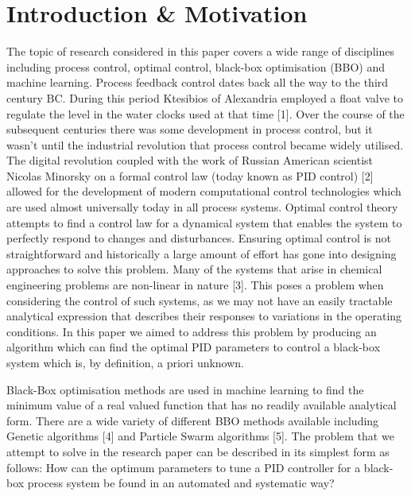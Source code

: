 \documentclass[conference]{IEEEtran}
\theoremstyle{definition}
\begin{document}
\section{Introduction \& Motivation}
\noindent The topic of research considered in this paper covers a wide range of disciplines including process control, optimal control, black-box optimisation (BBO) and machine learning. Process feedback control dates back all the way to the third century BC. During this period Ktesibios of Alexandria employed a float valve to regulate the level in the water clocks used at that time [1]. Over the course of the subsequent centuries there was some development in process control, but it wasn’t until the industrial revolution that process control became widely utilised. The digital revolution coupled with the work of Russian American scientist Nicolas Minorsky on a formal control law (today known as PID control) [2] allowed for the development of modern computational control technologies which are used almost universally today in all process systems. Optimal control theory attempts to find a control law for a dynamical system that enables the system to perfectly respond to changes and disturbances. Ensuring optimal control is not straightforward and historically a large amount of effort has gone into designing approaches to solve this problem. Many of the systems that arise in chemical engineering problems are non-linear in nature [3]. This poses a problem when considering the control of such systems, as we may not have an easily tractable analytical expression that describes their responses to variations in the operating conditions. In this paper we aimed to address this problem by producing an algorithm which can find the optimal PID parameters to control a black-box system which is, by definition, a priori unknown. 

\noindent Black-Box optimisation methods are used in machine learning to find the minimum value of a real valued function that has no readily available analytical form. There are a wide variety of different BBO methods available including Genetic algorithms [4] and Particle Swarm algorithms [5]. The problem that we attempt to solve in the research paper can be described in its simplest form as follows: How can the optimum parameters to tune a PID controller for a black-box process system be found in an automated and systematic way? 
\end{document}
